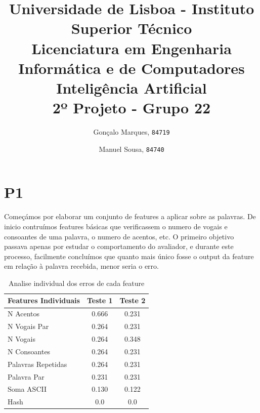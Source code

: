 \documentclass[11pt,twocolumn]{article}
\begin{document}
    
    \title{
        \textnormal{
        \LARGE Universidade de Lisboa - Instituto Superior Técnico\\
        \Large Licenciatura em Engenharia Informática e de Computadores\\
        \Large Inteligência Artificial
    \\}
        \LARGE2º Projeto - Grupo 22
        \vspace{-1ex}
        }
    \author{Gonçalo Marques,
        \texttt{84719}
        \and
        Manuel Sousa,
        \texttt{84740}
    }
    \date{	\vspace{-1ex}
            \vspace{-4ex}
        }
    \maketitle
    
    \section*{P1}
    
    Começámos por elaborar um conjunto de features a aplicar sobre as palavras. De inicio contruímos features básicas que verificassem o numero de vogais e consoantes de uma palavra, o numero de acentos, etc. O primeiro objetivo passava apenas por estudar
    o comportamento do avaliador, e durante este processo, facilmente concluímos que quanto mais único fosse o output da feature em relação à palavra recebida, menor seria o erro.
    
    
    \begin{table}[htbp]
        \centering
        \caption{Analise individual dos erros de cada feature}
        \label{my-label}
        \begin{tabular}{|l|c|c|}
        \hline
        \multicolumn{1}{|c|}{Features Individuais}     & \textbf{Teste 1} & \textbf{Teste 2}                    \\ \hline
        [F1] N Acentos & 0.666   & 0.231 \\ \hline
        [F2] N Vogais Par & 0.264   & 0.231 \\ \hline
        [F3] N Vogais & 0.264   & 0.348 \\ \hline
        [F4] N Consoantes   & 0.264  & 0.231      \\ \hline
        [F5] Palavras Repetidas   & 0.264  & 0.231      \\ \hline
        [F6] Palavra Par   & 0.231  & 0.231      \\ \hline
        [F7] Soma ASCII                             & 0.130            & 0.122                                \\ \hline
        [F8] Hash                             & 0.0              & 0.0                                 \\ \hline
        \end{tabular}
        \end{table}
    \par
\end{document}
